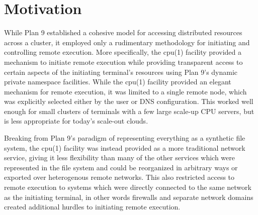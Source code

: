 \documentclass{sig-alternate}
\begin{document}


\maketitle


\section{Motivation}

While Plan 9 established a cohesive model for accessing distributed
resources across a cluster, it employed only a rudimentary methodology
for initiating and controlling remote execution.  
More specifically, the cpu(1) facility provided a mechanism to initiate
remote execution while providing transparent access to certain aspects of 
the initiating terminal's resources using Plan 9's dynamic private namespace
facilities. 
While the cpu(1) facility provided an elegant mechanism for remote execution, 
it was limited to a single remote node, which was explicitly selected either
by the user or DNS configuration.  This worked well enough for small clusters
of terminals with a few large scale-up CPU servers, but is less appropriate
for today's scale-out clouds. 

Breaking from Plan 9's paradigm of representing everything as a 
synthetic file system, the cpu(1) facility was instead provided as a more
traditional network service, giving it less flexibility than many of the
other services which were represented in the file system and could be
reorganized in arbitrary ways or exported over heterogenous remote networks.
This also restricted access to remote execution to systems which were 
directly connected to the same network as the initiating terminal, in other
words firewalls and separate network domains created additional hurdles to
initiating remote execution.
\end{document}
